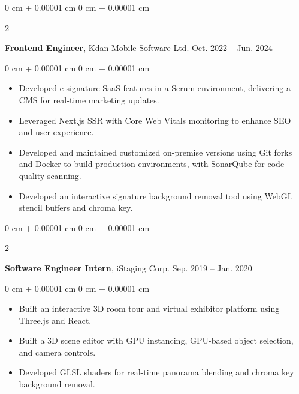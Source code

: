 \documentclass[10pt, letterpaper]{article}
\newenvironment{highlights}{
    \begin{itemize}[
        topsep=0.10 cm,
        parsep=0.10 cm,
        partopsep=0pt,
        itemsep=0pt,
        leftmargin=0 cm + 10pt
    ]
}{
    \end{itemize}
} %
\newenvironment{onecolentry}{
    \begin{adjustwidth}{
        0 cm + 0.00001 cm
    }{
        0 cm + 0.00001 cm
    }
}{
    \end{adjustwidth}
} %
\newenvironment{twocolentry}[2][]{
    \onecolentry
    \def\secondColumn{#2}
    \setcolumnwidth{\fill, 4.5 cm}
    \begin{paracol}{2}
}{
    \switchcolumn \raggedleft \secondColumn
    \end{paracol}
    \endonecolentry
} %
\begin{document}
        \begin{twocolentry}{
            Oct. 2022 – Jun. 2024
        }
            \textbf{Frontend Engineer}, Kdan Mobile Software Ltd.\end{twocolentry}

        \vspace{0.10 cm}
        \begin{onecolentry}
            \begin{highlights}
                \item Developed e-signature SaaS features in a Scrum environment, delivering a CMS for real-time marketing updates.
                \item Leveraged Next.js SSR with Core Web Vitals monitoring to enhance SEO and user experience.
                \item Developed and maintained customized on-premise versions using Git forks and Docker to build production environments, with SonarQube for code quality scanning.
                \item Developed an interactive signature background removal tool using WebGL stencil buffers and chroma key.
            \end{highlights}
        \end{onecolentry}

        \vspace{0.2 cm}

        \begin{twocolentry}{
            Sep. 2019 – Jan. 2020
        }
            \textbf{Software Engineer Intern}, iStaging Corp.\end{twocolentry}

        \vspace{0.10 cm}
        \begin{onecolentry}
            \begin{highlights}
                \item Built an interactive 3D room tour and virtual exhibitor platform using Three.js and React.
                \item Built a 3D scene editor with GPU instancing, GPU-based object selection, and camera controls.
                \item Developed GLSL shaders for real-time panorama blending and chroma key background removal.
            \end{highlights}
        \end{onecolentry}

    
    
\end{document}
